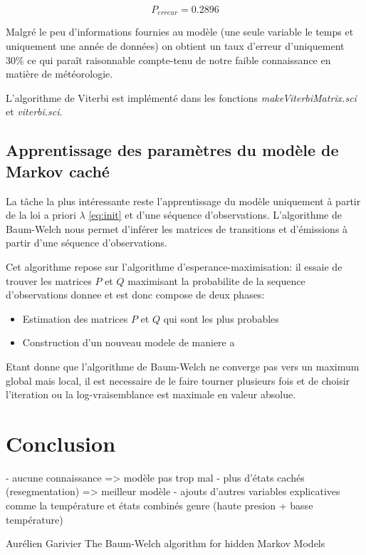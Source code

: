\documentclass{article}
\begin{document}
\begin{multicols}{2}
\begin{equation}\label{perreur}
    P_{erreur} = 0.2896
\end{equation}

Malgré le peu d'informations fournies au modèle (une seule variable le
temps et uniquement une année de données) on obtient un taux d'erreur
d'uniquement 30\% ce qui paraît raisonnable compte-tenu de notre faible
connaissance en matière de météorologie.

L'algorithme de Viterbi est implémenté dans les fonctions
\emph{makeViterbiMatrix.sci} et \emph{viterbi.sci}.

\subsection{Apprentissage des paramètres du modèle de Markov caché}

La tâche la plus intéressante reste l'apprentissage du modèle uniquement à
partir de la loi a priori $\lambda$ \ref{eq:init} et d'une séquence
d'observations. L'algorithme de Baum-Welch nous permet d'inférer les matrices
de transitions et d'émissions à partir d'une séquence d'observations.

Cet algorithme repose sur l'algorithme d'esperance-maximisation: il essaie de
trouver les matrices $P$ et $Q$ maximisant la probabilite de la sequence
d'observations donnee et est donc compose de deux phases:

\begin{itemize}
    \item Estimation des matrices $P$ et $Q$ qui sont les plus probables
    \item Construction d'un nouveau modele de maniere a
\end{itemize}

Etant donne que l'algorithme de Baum-Welch ne converge pas vers un maximum
global mais local, il est necessaire de le faire tourner plusieurs fois et de
choisir l'iteration ou la log-vraisemblance est maximale en valeur absolue.


\section{Conclusion}\label{sec:conclu}

- aucune connaissance => modèle pas trop mal
- plus d'états cachés (resegmentation) => meilleur modèle
- ajouts d'autres variables explicatives comme la température et états combinés
genre (haute presion + basse température)


\begin{thebibliography}{99}
        Aurélien Garivier
        \newblock The Baum-Welch algorithm for hidden Markov Models
\end{thebibliography}

\end{multicols}
\end{document}

